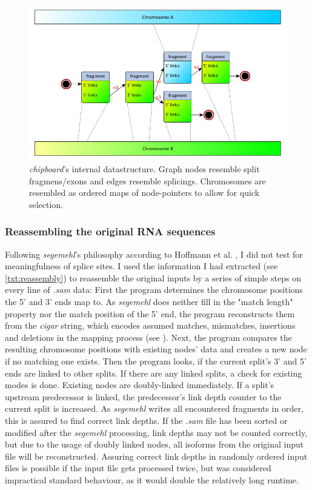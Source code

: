 \documentclass[11pt]{article}
\begin{document}
\begin{figure}[htb]
\centering
\includegraphics[width=.9\linewidth]{./datatype.png}
\caption[\textit{chipboard}'s internal datastructure]{\textit{chipboard}'s internal datastructure. Graph nodes resemble split fragmens/exons and edges resemble splicings. Chromosomes are resembled as ordered maps of node-pointers to allow for quick selection.}\label{fig-datastructure}
\end{figure}


\subsubsection{Reassembling the original RNA sequences}
\label{sec-2-3-1}

Following \emph{segemehl}'s philosophy according to Hoffmann et al. \cite{smpaper}, I did not test for
meaningfulness of splice sites. I used the information I had extracted (see \ref{txt:reassembly})
to reassemble the original inputs by a series of simple steps on every line of \emph{.sam} data:
First the program determines the chromosome positions the 5' and 3' ends map to. As
\emph{segemehl} does neither fill in the "match length" property nor the match position of the 5' end,
the program reconstructs them from the \emph{cigar} string, which encodes assumed matches, mismatches,
insertions and deletions in the mapping process (see \cite{samFormat}). 
Next, the program compares the resulting chromosome positions with existing nodes' data and 
creates a new node if no matching one exists.
Then the program looks, if the current split's 3' and 5' ends are linked to other splits. If
there are any linked splits, a check for existing modes is done. Existing nodes are doubly-linked
immediately. If a split's upstream predecessor is linked, the predecessor's link depth counter
to the current split is increased. As \emph{segemehl} writes all encountered fragments in order, this
is assured to find correct link depths. If the \emph{.sam} file has been sorted or modified after 
the \emph{segemehl} processing, link depths may not be counted correctly, but due to the usage
of doubly linked nodes, all isoforms from the original input file will be reconstructed.
Assuring correct link depths in randomly ordered input files is possible if the input file gets
processed twice, but was considered impractical standard behaviour, as it would double the 
relatively long runtime.
\end{document}
